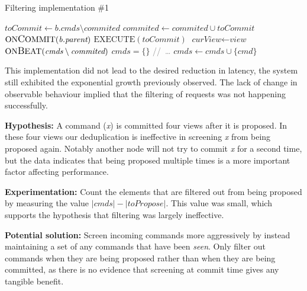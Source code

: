 \begin{algorithm}[h!]
	\caption{Filtering implementation \#1}
	\begin{algorithmic}[1]
			\State $\textit{toCommit} \gets \textit{b.cmds} \setminus \textit{commited} $
			\State $\textit{commited} \gets \textit{commited} \cup \textit{toCommit}$
			\State $\text{ON{\large C}OMMIT}(\textit{b.parent})$
			\State $\text{EXECUTE}(\textit{toCommit})$
		\EndIf
	\EndProcedure
		\State $ \textit{curView} \gets \textit{view}$
		\State $ \text{ON{\large B}EAT}(\textit{cmds} \setminus \textit{commited})$
		\State $ \textit{cmds} = \{\}$
		\State \textcolor{gray}{//\ \dots}
	\EndProcedure
		\State $ \textit{cmds} \gets \textit{cmds} \cup \{\textit{cmd}\} $
	\EndProcedure
	\end{algorithmic}
\end{algorithm}

This implementation did not lead to the desired reduction in latency, the system still exhibited the exponential growth previously observed. The lack of change in observable behaviour implied that the filtering of requests was not happening successfully.

\textbf{Hypothesis: } A command (\textit{x}) is committed four views after it is proposed. In these four views our deduplication is ineffective in screening \textit{x} from being proposed again. Notably another node will not try to commit \textit{x} for a second time, but the data indicates that being proposed multiple times is a more important factor affecting performance. 

\textbf{Experimentation: } Count the elements that are filtered out from being proposed by measuring the value $|\textit{cmds}| - |\textit{toPropose}|$. This value was small, which supports the hypothesis that filtering was largely ineffective.

\textbf{Potential solution: } Screen incoming commands more aggressively by instead maintaining a set of any commands that have been \textit{seen}. Only filter out commands when they are being proposed rather than when they are being committed, as there is no evidence that screening at commit time gives any tangible benefit.


